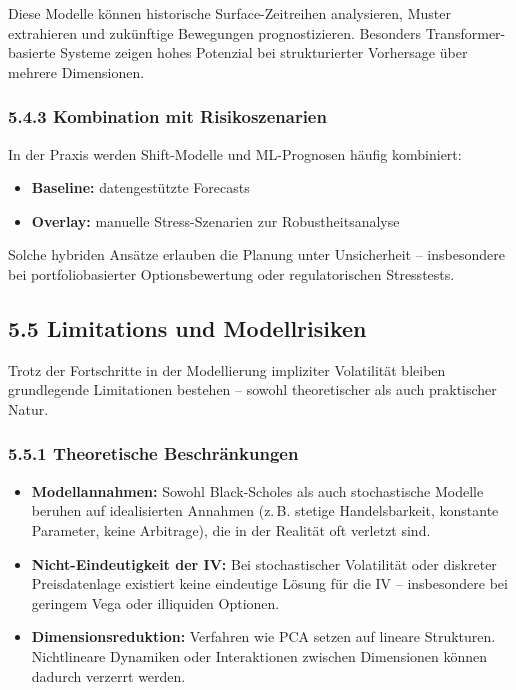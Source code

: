 \documentclass[a4paper,12pt]{article}
\begin{document}
Diese Modelle können historische Surface-Zeitreihen analysieren, Muster extrahieren und zukünftige Bewegungen prognostizieren. Besonders Transformer-basierte Systeme zeigen hohes Potenzial bei strukturierter Vorhersage über mehrere Dimensionen.

\subsubsection*{5.4.3 Kombination mit Risikoszenarien}

In der Praxis werden Shift-Modelle und ML-Prognosen häufig kombiniert:

\begin{itemize}
  \item \textbf{Baseline:} datengestützte Forecasts
  \item \textbf{Overlay:} manuelle Stress-Szenarien zur Robustheitsanalyse
\end{itemize}

Solche hybriden Ansätze erlauben die Planung unter Unsicherheit – insbesondere bei portfoliobasierter Optionsbewertung oder regulatorischen Stresstests.


\subsection*{5.5 Limitations und Modellrisiken}

Trotz der Fortschritte in der Modellierung impliziter Volatilität bleiben grundlegende Limitationen bestehen – sowohl theoretischer als auch praktischer Natur.

\subsubsection*{5.5.1 Theoretische Beschränkungen}

\begin{itemize}
  \item \textbf{Modellannahmen:} Sowohl Black-Scholes als auch stochastische Modelle beruhen auf idealisierten Annahmen (z.\,B. stetige Handelsbarkeit, konstante Parameter, keine Arbitrage), die in der Realität oft verletzt sind.
  \item \textbf{Nicht-Eindeutigkeit der IV:} Bei stochastischer Volatilität oder diskreter Preisdatenlage existiert keine eindeutige Lösung für die IV – insbesondere bei geringem Vega oder illiquiden Optionen.
  \item \textbf{Dimensionsreduktion:} Verfahren wie PCA setzen auf lineare Strukturen. Nichtlineare Dynamiken oder Interaktionen zwischen Dimensionen können dadurch verzerrt werden.
\end{itemize}
\end{document}
